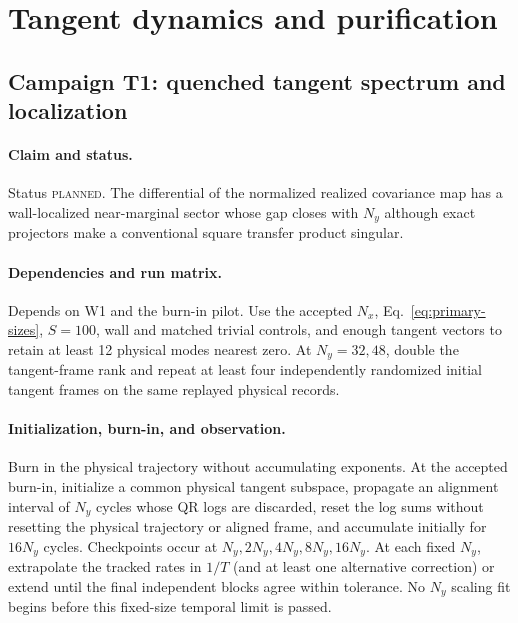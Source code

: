 \documentclass[aps,prx,onecolumn,nofootinbib,superscriptaddress,longbibliography]{revtex4-2}
\newcommand{\planned}{\textsc{planned}}
\begin{document}
\section{Tangent dynamics and purification}

\subsection{Campaign T1: quenched tangent spectrum and localization}
\paragraph{Claim and status.}
Status \planned.  The differential of the normalized realized covariance map has a
wall-localized near-marginal sector whose gap closes with $N_y$ although exact projectors
make a conventional square transfer product singular.

\paragraph{Dependencies and run matrix.}
Depends on W1 and the burn-in pilot.  Use the accepted $N_x$, Eq.~\eqref{eq:primary-sizes},
$S=100$, wall and matched trivial controls, and enough tangent vectors to retain at least 12
physical modes nearest zero.  At $N_y=32,48$, double the tangent-frame rank and repeat at
least four independently randomized initial tangent frames on the same replayed physical
records.

\paragraph{Initialization, burn-in, and observation.}
Burn in the physical trajectory without accumulating exponents.  At the accepted burn-in,
initialize a common physical tangent subspace, propagate an alignment interval of $N_y$
cycles whose QR logs are discarded, reset the log sums without resetting the physical
trajectory or aligned frame, and accumulate initially for $16N_y$ cycles.  Checkpoints
occur at $N_y,2N_y,4N_y,8N_y,16N_y$.  At each fixed $N_y$, extrapolate the tracked rates in
$1/T$ (and at least one alternative correction) or extend until the final independent
blocks agree within tolerance.  No $N_y$ scaling fit begins before this fixed-size temporal
limit is passed.
\end{document}
